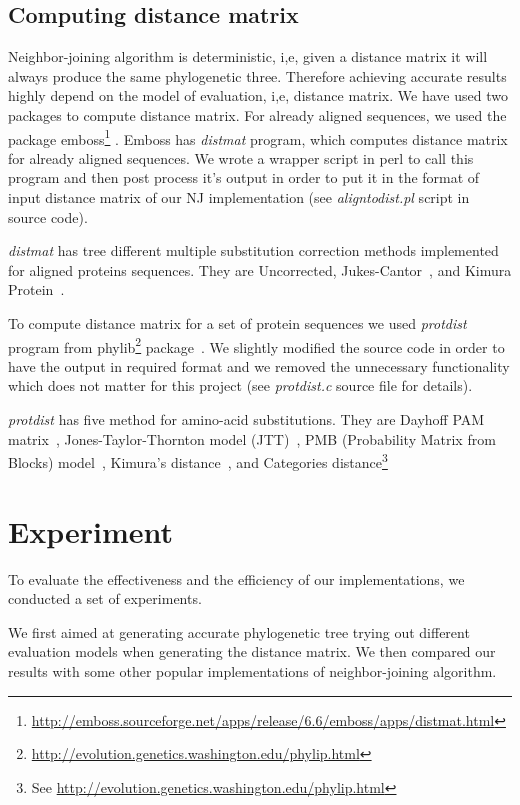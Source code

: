 \documentclass[11pt,letterpaper]{article}
\theoremstyle{definition}
\begin{document}
\subsection{Computing distance matrix}

Neighbor-joining algorithm is deterministic, i,e, given a distance matrix it will always produce the same phylogenetic three. Therefore achieving accurate results highly depend on the model of evaluation, i,e, distance matrix.
We have used two packages to compute distance matrix. For already aligned sequences, we used the package emboss\footnote{\url{http://emboss.sourceforge.net/apps/release/6.6/emboss/apps/distmat.html}} \cite{rice2000emboss}. Emboss has \textit{distmat} program, which computes distance matrix for already aligned sequences. We wrote a wrapper script in perl to call this program and then post process it's output in order to put it in the format of input distance matrix of our NJ implementation (see \textit{aligntodist.pl} script in source code).

\textit{distmat} has tree different multiple substitution correction methods implemented for aligned proteins sequences. They are Uncorrected, Jukes-Cantor~\cite{jukes1969evolution}, and Kimura Protein~\cite{kimura1980simple}. 

To compute distance matrix for a set of protein sequences we used \textit{protdist} program from phylib\footnote{\url{http://evolution.genetics.washington.edu/phylip.html}} package~\cite{plotree1989phylip}. We slightly modified the source code in order to have the output in required format and we removed the unnecessary functionality which does not matter for this project (see \textit{protdist.c} source file for details).

\textit{protdist} has five method for amino-acid substitutions. They are Dayhoff PAM matrix~\cite{kosiol2005different}, Jones-Taylor-Thornton model (JTT)~\cite{jones1992rapid}, PMB (Probability Matrix from Blocks) model~\cite{veerassamy2003transition}, Kimura's distance~\cite{kimura1983rare}, and Categories distance\footnote{See \url{http://evolution.genetics.washington.edu/phylip.html}}

\section{Experiment}

To evaluate the effectiveness and the efficiency of our implementations, we conducted a set of experiments. 

We first aimed at generating accurate phylogenetic tree trying out different evaluation models when generating the distance matrix. We then compared our results with some other popular implementations of neighbor-joining algorithm. 
\end{document}
